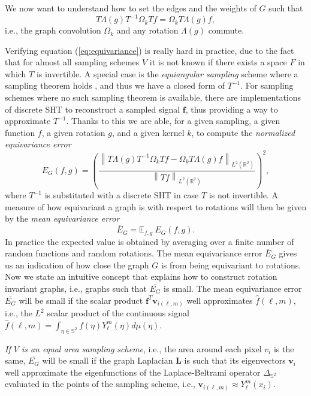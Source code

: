 \documentclass{article} %
\newcommand{\norm}[1]{\left\lVert#1\right\rVert}
\begin{document}
We now want to understand how to set the edges and the weights of $G$ such that
\begin{equation} \label{eq:equivariance}
	T \Lambda(g) T^{-1} \Omega_k T f = \Omega_k T \Lambda(g) f,
\end{equation}
i.e., the graph convolution $\Omega_k$ and any rotation $\Lambda(g)$ commute.

Verifying equation (\ref{eq:equivariance}) is really hard in practice, due to the fact that for almost all sampling schemes $V$ it is not known if there exists a space $F$ in which $T$ is invertible. A special case is the \textit{equiangular sampling} scheme where a sampling theorem holds \cite{Driscoll:1994:CFT:184069.184073}, and thus we have a closed form of $T^{-1}$. For sampling schemes where no such sampling theorem is available, there are implementations of discrete SHT to reconstruct a sampled signal $\mathbf f$, thus providing a way to approximate $T^{-1}$. Thanks to this we are able, for a given sampling, a given function $f$, a given rotation $g$, and a given kernel $k$, to compute the \textit{normalized equivariance error}
\begin{equation} \label{eq:equivariance error}
	E_{G}(f, g) = \left(\frac{ \norm {T \Lambda(g) T^{-1} \Omega_k Tf - \Omega_k T \Lambda(g) f}_{L^2(\mathbb R^2)}}{\norm {Tf}_{L^2(\mathbb R^2)}}\right)^2,
\end{equation}
where $T^{-1}$ is substituted with a discrete SHT in case $T$ is not invertible.
A measure of how equivariant a graph is with respect to rotations will then be given by the \textit{mean equivariance error}
\begin{equation} \label{eq:mean equivariance error}
	\overline E_G = \mathbb E_{f, g} \ E_G(f, g).
\end{equation}
In practice the expected value is obtained by averaging over a finite number of random functions and random rotations. The mean equivariance error $\overline E_G$ gives us an indication of how close the graph $G$ is from being equivariant to rotations. Now we state an intuitive concept that explains how to construct rotation invariant graphs, i.e., graphs such that $\overline{E_G}$ is small.
The mean equivariance error $\overline{E_G}$ will be small if the scalar product $\mathbf f^T \mathbf v_{i(\ell, m)}$ well approximates $\hat {f}(\ell,m)$, i.e., the $L^2$ scalar product of the continuous signal $\hat {f}(\ell,m)= \int_{\eta \in \mathbb S^2}f(\eta)Y_\ell^m(\eta)d\mu(\eta)$.

\textit{If $V$ is an equal area sampling scheme}, i.e., the area around each pixel $v_i$ is the same, $\overline{E_G}$ will be small if the graph Laplacian $\mathbf L$ is such that its eigenvectors $\mathbf v_i$ well approximate the eigenfunctions of the Laplace-Beltrami operator $\Delta_{\mathbb S^2}$ evaluated in the points of the sampling scheme, i.e., $\mathbf v_{i(\ell, m)} \approx Y_\ell^m(x_i)$.
\end{document}
